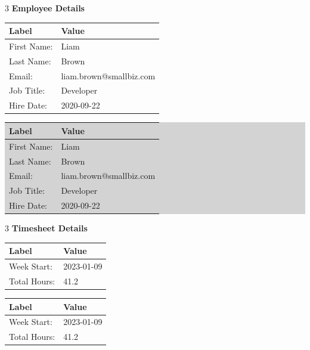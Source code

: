 \documentclass{article}
\begin{document}
\begin{multicols}{3}
\textbf{Employee Details}\\
\vspace{-10pt}
\end{multicols}

\noindent
\begin{minipage}[t]{0.45\linewidth}
\begin{tabularx}{\textwidth}{|l|X|}
\hline
\textbf{Label} & \textbf{Value} \\
\hline
First Name: & Liam \\
Last Name: & Brown \\
Email: & liam.brown@smallbiz.com \\
Job Title: & Developer \\
Hire Date: & 2020-09-22 \\
\hline
\end{tabularx}
\end{minipage}\hfill
\begin{minipage}[t]{0.45\linewidth}
\colorbox{lightgray}{%
\begin{tabularx}{\textwidth}{|l|X|}
\hline
\textbf{Label} & \textbf{Value} \\
\hline
First Name: & Liam \\
Last Name: & Brown \\
Email: & liam.brown@smallbiz.com \\
Job Title: & Developer \\
Hire Date: & 2020-09-22 \\
\hline
\end{tabularx}
}
\end{minipage}

\vspace{-10pt}

\begin{multicols}{3}
\textbf{Timesheet Details}\\
\vspace{-10pt}
\end{multicols}

\noindent
\begin{minipage}[t]{0.45\linewidth}
\begin{tabularx}{\textwidth}{|l|X|}
\hline
\textbf{Label} & \textbf{Value} \\
\hline
Week Start: & 2023-01-09 \\
Total Hours: & 41.2 \\
\hline
\end{tabularx}
\end{minipage}\hfill
\begin{minipage}[t]{0.45\linewidth}
\begin{tabularx}{\textwidth}{|l|X|}
\hline
\textbf{Label} & \textbf{Value} \\
\hline
Week Start: & 2023-01-09 \\
Total Hours: & 41.2 \\
\hline
\end{tabularx}
\end{minipage}
\end{document}
